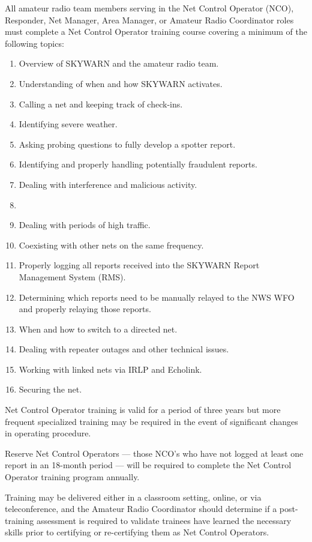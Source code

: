 \documentclass[pdflatex,letterpaper,twoside,12pt]{book}
\begin{document}
All amateur radio team members serving in the Net Control Operator (NCO), Responder, Net Manager, Area Manager, or Amateur Radio Coordinator roles must complete a Net Control Operator training course covering a minimum of the following topics:

\begin{enumerate}
\item Overview of SKYWARN and the amateur radio team.
\item Understanding of when and how SKYWARN activates.
\item Calling a net and keeping track of check-ins.
\item Identifying severe weather.
\item Asking probing questions to fully develop a spotter report.
\item Identifying and properly handling potentially fraudulent reports.
\item Dealing with interference and malicious activity.
\item {}
\item Dealing with periods of high traffic.
\item Coexisting with other nets on the same frequency.
\item Properly logging all reports received into the SKYWARN Report Management System (RMS).
\item Determining which reports need to be manually relayed to the NWS WFO and properly relaying those reports.
\item When and how to switch to a directed net.
\item Dealing with repeater outages and other technical issues.
\item Working with linked nets via IRLP and Echolink.
\item Securing the net.
\end{enumerate}

Net Control Operator training is valid for a period of three years but more frequent specialized training may be required in the event of significant changes in operating procedure.

Reserve Net Control Operators --- those NCO's who have not logged at least one report in an 18-month period --- will be required to complete the Net Control Operator training program annually.

Training may be delivered either in a classroom setting, online, or via teleconference, and the Amateur Radio Coordinator should determine if a post-training assessment is required to validate trainees have learned the necessary skills prior to certifying or re-certifying them as Net Control Operators.
\end{document}
